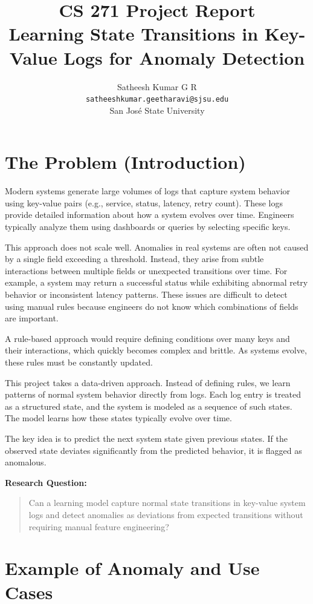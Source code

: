 \documentclass[12pt]{article}
\title{\textbf{CS 271 Project Report} \\[0.3em]
\large Learning State Transitions in Key-Value Logs for Anomaly Detection}
\author{
\begin{tabular}{c}
Satheesh Kumar G R \\
\texttt{satheeshkumar.geetharavi@sjsu.edu} \\
San Jos\'{e} State University
\end{tabular}
}
\begin{document}
\maketitle

\section{The Problem (Introduction)}

Modern systems generate large volumes of logs that capture system behavior using key-value pairs (e.g., service, status, latency, retry count). These logs provide detailed information about how a system evolves over time. Engineers typically analyze them using dashboards or queries by selecting specific keys.

This approach does not scale well. Anomalies in real systems are often not caused by a single field exceeding a threshold. Instead, they arise from subtle interactions between multiple fields or unexpected transitions over time. For example, a system may return a successful status while exhibiting abnormal retry behavior or inconsistent latency patterns. These issues are difficult to detect using manual rules because engineers do not know which combinations of fields are important.

A rule-based approach would require defining conditions over many keys and their interactions, which quickly becomes complex and brittle. As systems evolve, these rules must be constantly updated.

This project takes a data-driven approach. Instead of defining rules, we learn patterns of normal system behavior directly from logs. Each log entry is treated as a structured state, and the system is modeled as a sequence of such states. The model learns how these states typically evolve over time.

The key idea is to predict the next system state given previous states. If the observed state deviates significantly from the predicted behavior, it is flagged as anomalous.


\textbf{Research Question:}

\begin{quote}
Can a learning model capture normal state transitions in key-value system logs and detect anomalies as deviations from expected transitions without requiring manual feature engineering?
\end{quote}

\section{Example of Anomaly and Use Cases}
\end{document}
